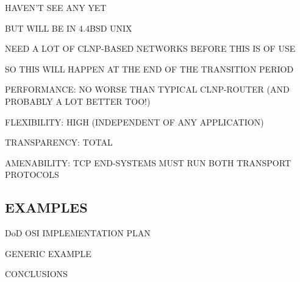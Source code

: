 \begin{bwslide}

\begin{nrtc}
\item	HAVEN'T SEE ANY YET
    \begin{nrtc}
    \item	BUT WILL BE IN 4.4BSD UNIX
    \end{nrtc}

\item	NEED A LOT OF CLNP-BASED NETWORKS BEFORE THIS IS OF USE

\item	SO THIS WILL HAPPEN AT THE END OF THE TRANSITION PERIOD
\end{nrtc}
\end{bwslide}


\begin{bwslide}

\begin{nrtc}
\item	PERFORMANCE: NO WORSE THAN TYPICAL CLNP-ROUTER (AND PROBABLY A LOT
	BETTER TOO!)

\item	FLEXIBILITY: HIGH (INDEPENDENT OF ANY APPLICATION)

\item	TRANSPARENCY: TOTAL

\item	AMENABILITY: TCP END-SYSTEMS MUST RUN BOTH TRANSPORT PROTOCOLS
\end{nrtc}
\end{bwslide}


\begin{bwslide}
\part	{EXAMPLES}\bf

\begin{nrtc}
\item	DoD OSI IMPLEMENTATION PLAN

\item	GENERIC EXAMPLE

\item	CONCLUSIONS
\end{nrtc}
\end{bwslide}


